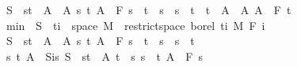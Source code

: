 \begin{isabellebody}
\ {\isachardoublequoteopen}S\ {\isasymin}\ {\isacharbraceleft}{\kern0pt}{\isacharbraceleft}{\kern0pt}s{\isacharless}{\kern0pt}{\isachardot}{\kern0pt}{\isachardot}{\kern0pt}t{\isacharbraceright}{\kern0pt}\ {\isasymtimes}\ A\ {\isacharbar}{\kern0pt}\ A\ s\ t{\isachardot}{\kern0pt}\ A\ {\isasymin}\ F\ s\ {\isasymand}\ t\ {\isasymle}\ s\ {\isasymand}\ s\ {\isacharless}{\kern0pt}\ t{\isacharbraceright}{\kern0pt}\ {\isasymunion}\ {\isacharbraceleft}{\kern0pt}{\isacharbraceleft}{\kern0pt}t\ {\isasymtimes}\ A\ {\isacharbar}{\kern0pt}\ A{\isachardot}{\kern0pt}\ A\ {\isasymin}\ F\ t\isanewline
\ \ \ \ \isamarkupfalse%
\ {\isachardoublequoteopen}{\isacharquery}{\kern0pt}min\ {\isacharminus}{\kern0pt}{\isacharbackquote}{\kern0pt}\ S\ {\isasyminter}\ {\isacharparenleft}{\kern0pt}{\isacharbraceleft}{\kern0pt}ti{\isacharbraceright}{\kern0pt}\ {\isasymtimes}\ space\ M{\isacharparenright}{\kern0pt}\ {\isasymin}\ restrict{\isacharunderscore}{\kern0pt}space\ borel\ {\isacharbraceleft}{\kern0pt}ti{\isacharbraceright}{\kern0pt}\ {\isasymOtimes}\isactrlsub M\ F\ i{\isachardoublequoteclose}\isanewline
\ \ \ \ \isamarkupfalse%
\isanewline
\ \ \ \ \ \ \isamarkupfalse%
\ {\isachardoublequoteopen}S\ {\isasymin}\ {\isacharbraceleft}{\kern0pt}{\isacharbraceleft}{\kern0pt}s{\isacharless}{\kern0pt}{\isachardot}{\kern0pt}{\isachardot}{\kern0pt}t{\isacharbraceright}{\kern0pt}\ {\isasymtimes}\ A\ {\isacharbar}{\kern0pt}\ A\ s\ t{\isachardot}{\kern0pt}\ A\ {\isasymin}\ F\ s\ {\isasymand}\ t\ {\isasymle}\ s\ {\isasymand}\ s\ {\isacharless}{\kern0pt}\ t{\isacharbraceright}{\kern0pt}{\isachardoublequoteclose}\isanewline
\ \ \ \ \ \ \isamarkupfalse%
\ \isamarkupfalse%
\ s\ t\ A\ \ S{\isacharunderscore}{\kern0pt}is{\isacharcolon}{\kern0pt}\ {\isachardoublequoteopen}S\ {\isacharequal}{\kern0pt}\ {\isacharbraceleft}{\kern0pt}s{\isacharless}{\kern0pt}{\isachardot}{\kern0pt}{\isachardot}{\kern0pt}t{\isacharbraceright}{\kern0pt}\ {\isasymtimes}\ A{\isachardoublequoteclose}\ {\isachardoublequoteopen}t\ {\isasymle}\ s{\isachardoublequoteclose}\ {\isachardoublequoteopen}s\ {\isacharless}{\kern0pt}\ t{\isachardoublequoteclose}\ {\isachardoublequoteopen}A\ {\isasymin}\ F\ s{\isachardoublequoteclose}\ \isamarkupfalse%

\end{isabellebody}

